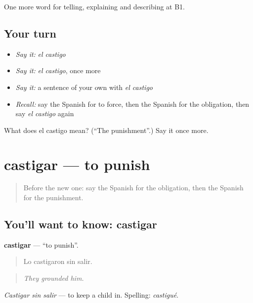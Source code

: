 \begin{grammarlens}[title={What you've built}]
One more word for telling, explaining and describing at B1.
\end{grammarlens}

\subsection*{Your turn}
\begin{itemize}
\raggedright
  \item \emph{Say it:} \emph{el castigo}
  \item \emph{Say it:} \emph{el castigo}, once more
  \item \emph{Say it:} a sentence of your own with \emph{el castigo}
  \item \emph{Recall:} say the Spanish for to force, then the Spanish for the obligation, then say \emph{el castigo} again
\end{itemize}

\begin{tcolorbox}[breakable,colback=teal!4,colframe=teal!35!black,title={Before you move on}]
What does el castigo mean? (\textquotedblleft{}The punishment\textquotedblright{}.) Say it once more.
\end{tcolorbox}
\section[castigar]{castigar — to punish}

\label{lesson:ES-C623-castigar}



\begin{quote}
Before the new one: say the Spanish for the obligation, then the Spanish for the punishment.
\end{quote}

\subsection*{You'll want to know: castigar}
\textbf{castigar} — \textquotedblleft{}to punish\textquotedblright{}.

\begin{quote}
Lo castigaron sin salir.
\end{quote}

\begin{quote}
\emph{They grounded him.}
\end{quote}

\emph{Castigar sin salir} — to keep a child in. Spelling: \emph{castigué}.


